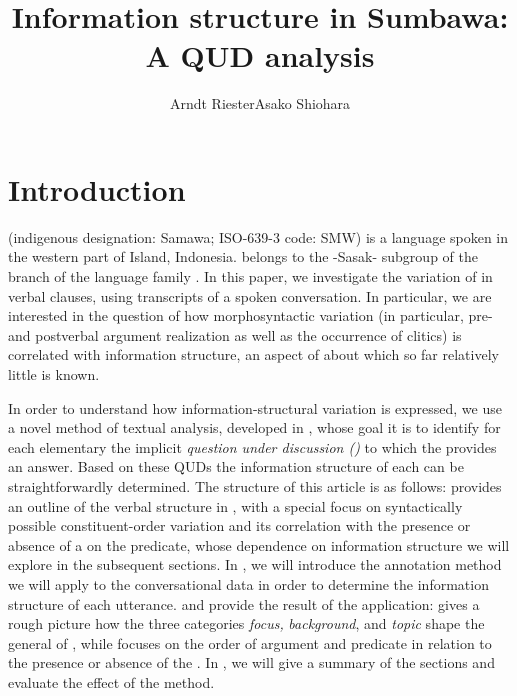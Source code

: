 \documentclass[output=paper
,modfonts
,nonflat]{langsci/langscibook}
\title{Information structure in Sumbawa: A QUD analysis}
\author{Arndt Riester\affiliation{Institute for Natural Language Processing (IMS), University of Stuttgart}\lastand Asako Shiohara\affiliation{Research Institute for Languages and Cultures of Asia and Africa (ILCAA),\newline Tokyo University of Foreign Studies}}
\begin{document}
	
\maketitle
	
\section{Introduction}\label{sect:intro}

 (indigenous designation: Samawa; ISO-639-3 code: SMW) is a language spoken in the western part of  Island, Indonesia.  belongs to the -Sasak- subgroup of the  branch of the  language family \citep[][19]{adeal05,mbeaa90}. In this paper, we investigate the variation of  in  verbal clauses, using transcripts of a spoken conversation. In particular, we are interested in the question of how morphosyntactic variation (in particular, pre- and postverbal argument realization as well as the occurrence of clitics) is correlated with information structure, an aspect of  about which so far relatively little is known.


In order to understand how information-structural variation is expressed, we use a novel method of textual analysis, developed in \citet{reyuw16,riear17b}, whose goal it is to identify for each elementary  the implicit \textit{question under discussion ()} \citep{kupja95,bueda03,robcr12} to which the  provides an answer. Based on these QUDs the information structure of each  can be straightforwardly determined. The structure of this article is as follows:  provides an outline of the verbal  structure in , with a special focus on syntactically possible constituent-order variation and its correlation with the presence or absence of a  on the predicate, whose dependence on information structure we will explore in the subsequent sections. In , we will introduce the annotation method we will apply to the conversational data in order to determine the information structure of each utterance.  and  provide the result of the application:  gives a rough picture how the three categories \textit{focus,} \textit{background}, and \textit{ topic} shape the general  of , while  focuses on the order of argument and predicate in relation to the presence or absence of the . In , we will give a summary of the sections and evaluate the effect of the method.
\end{document}
